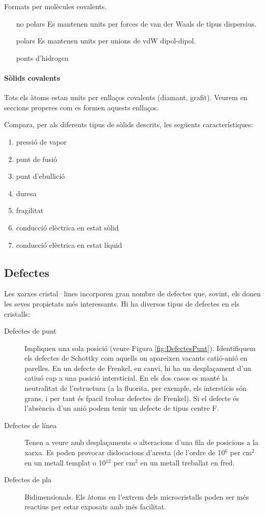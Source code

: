 Formats per molècules covalents. 
\begin{itemize}
\item[no polars] Es mantenen units per forces de van der Waals de tipus dispersius.
\item[polars] Es mantenen units per unions de vdW dipol-dipol.
\item[ponts d'hidrogen] 
\end{itemize}  

\paragraph{Sòlids covalents}

Tots els àtoms estan units per enllaços covalents (diamant, grafit). Veurem en seccions properes com es formen aquests enllaços.


\begin{exr}
Compara, per als diferents tipus de sòlids descrits, les següents característiques:
\begin{enumerate}
\item pressió de vapor
\item punt de fusió
\item punt d'ebullició
\item duresa
\item fragilitat
\item conducció elèctrica en estat sòlid
\item conducció elèctrica en estat líquid
\end{enumerate}
\end{exr}

\subsection{Defectes}

Les xarxes cristal·lines  incorporen gran nombre de defectes que, sovint, els donen les seves propietats més interessants. Hi ha diversos tipus de defectes en els cristalls:
\begin{description}
\item[Defectes de punt] Impliquen una sola posició (veure Figura \ref{fig:DefectesPunt}). Identifiquem els defectes de Schottky com aquells on apareixen vacants catió-anió en parelles. En un defecte de Frenkel, en canvi, hi ha un desplaçament d'un catiuó cap a una posició intersticial. En els dos casos es manté la neutralitat de l'estructura (a la fluorita, per exemple, els intersticis són grans, i per tant és fpacil trobar defectes de Frenkel). Si el defecte és l'absència d'un anió podem tenir un defecte de tipus centre F.
\item[Defectes de línea] Tenen a veure amb desplaçaments o alteracions d'una fila de posicions a la xarxa. Es poden provocar dislocacions d'aresta (de l'ordre de 10$^6$ per cm$^2$ en un metall templat o 10$^{12}$ per cm$^2$ en un metall treballat en fred.
\item[Defectes de pla] Bidimensionals. Els àtoms en l'extrem dels microcristalls poden ser més reactius per estar exposats amb més facilitat.
\end{description}


